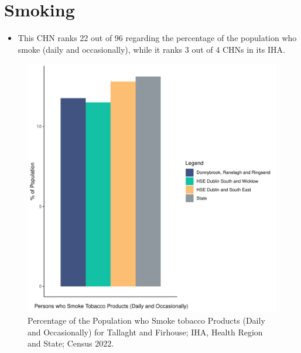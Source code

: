 \documentclass{article}
\begin{document}
\pagebreak

\section{Smoking}\label{sect:Smoking}
\begin{itemize}
\item This CHN ranks  22 out of 96 regarding the percentage of the population who smoke (daily and occasionally), while it ranks   3 out of 4 CHNs in its IHA.
\end{itemize}
\begin{figure}[H]
	\centering
	\includegraphics[width = 120mm]{../figures/SmokingED.pdf}
	\caption{Percentage of the Population who Smoke tobacco Products (Daily and Occasionally) for Tallaght and Firhouse; IHA, Health Region and State; Census 2022.}
	\label{fig:2ae19629-1a6a-13a3-e055-000000000001}
	\end{figure}
	
\end{document}
